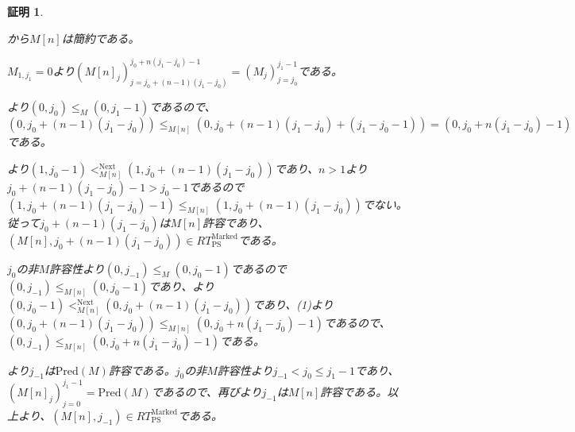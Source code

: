 \documentclass[dvipdfmx,uplatex]{jsarticle}
\newif\iffull
\theoremstyle{customnonumberbreakfortheorem}
\theoremstyle{customnonumberbreakforproof}
\newtheorem{hideableproof}{証明}
\begin{document}
\begin{hideableproof}
	\begin{penumerate}
		\item[] から\(M[n]\)は簡約である。
		\item[] \(M_{1,j_1} = 0\)より\((M[n]_j)_{j=j_0+(n-1)(j_1-j_0)}^{j_0+n(j_1-j_0)-1} = (M_j)_{j=j_0}^{j_1-1}\)である。
		\item {}より\((0,j_0) \leq_M (0,j_1-1)\)であるので、\((0,j_0+(n-1)(j_1-j_0)) \leq_{M[n]} (0,j_0+(n-1)(j_1-j_0)+(j_1-j_0-1)) = (0,j_0+n(j_1-j_0)-1)\)である。
		\item[] より\((1,j_0-1) <_{M[n]}^{\textrm{Next}} (1,j_0+(n-1)(j_1-j_0))\)であり、\(n > 1\)より\(j_0+(n-1)(j_1-j_0)-1 > j_0-1\)であるので\((1,j_0+(n-1)(j_1-j_0)-1) \leq_{M[n]} (1,j_0+(n-1)(j_1-j_0))\)でない。従って\(j_0+(n-1)(j_1-j_0)\)は\(M[n]\)許容であり、\((M[n],j_0+(n-1)(j_1-j_0)) \in RT_{\textrm{PS}}^{\textrm{Marked}}\)である。
		\item \(j_0\)の非\(M\)許容性より\((0,j_{-1}) \leq_M (0,j_0-1)\)であるので\((0,j_{-1}) \leq_{M[n]} (0,j_0-1)\)であり、より\((0,j_0-1) <_{M[n]}^{\textrm{Next}} (0,j_0+(n-1)(j_1-j_0))\)であり、(1)より\((0,j_0+(n-1)(j_1-j_0)) \leq_{M[n]} (0,j_0+n(j_1-j_0)-1)\)であるので、\((0,j_{-1}) \leq_{M[n]} (0,j_0+n(j_1-j_0)-1)\)である。
		\item[] より\(j_{-1}\)は\(\textrm{Pred}(M)\)許容である。\(j_0\)の非\(M\)許容性より\(j_{-1} < j_0 \leq j_1-1\)であり、\((M[n]_j)_{j=0}^{j_1-1} = \textrm{Pred}(M)\)であるので、再びより\(j_{-1}\)は\(M[n]\)許容である。以上より、\((M[n],j_{-1}) \in RT_{\textrm{PS}}^{\textrm{Marked}}\)である。
	\end{penumerate}
\end{hideableproof}

\iffull{それでは本題に戻る。}\fi
\end{document}
